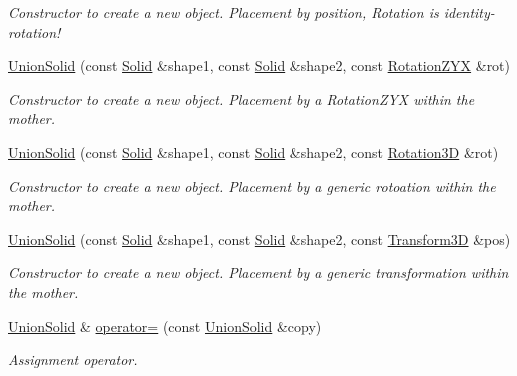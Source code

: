 \begin{DoxyCompactItemize}
\begin{DoxyCompactList}\small\item\em Constructor to create a new object. Placement by position, Rotation is identity-\/rotation! \item\end{DoxyCompactList}\item 
\hyperlink{class_d_d4hep_1_1_geometry_1_1_union_solid_a7756c7183422cf3f33cee33b161389e0}{UnionSolid} (const \hyperlink{class_d_d4hep_1_1_geometry_1_1_solid__type}{Solid} \&shape1, const \hyperlink{class_d_d4hep_1_1_geometry_1_1_solid__type}{Solid} \&shape2, const \hyperlink{namespace_d_d4hep_1_1_geometry_a24667b2b9c3cec3d5239828db4d52189}{RotationZYX} \&rot)
\begin{DoxyCompactList}\small\item\em Constructor to create a new object. Placement by a RotationZYX within the mother. \item\end{DoxyCompactList}\item 
\hyperlink{class_d_d4hep_1_1_geometry_1_1_union_solid_ab24f18730c80761ea9acb96e802242c3}{UnionSolid} (const \hyperlink{class_d_d4hep_1_1_geometry_1_1_solid__type}{Solid} \&shape1, const \hyperlink{class_d_d4hep_1_1_geometry_1_1_solid__type}{Solid} \&shape2, const \hyperlink{namespace_d_d4hep_1_1_geometry_a022fecb763315fa2bf39cbb648944a0e}{Rotation3D} \&rot)
\begin{DoxyCompactList}\small\item\em Constructor to create a new object. Placement by a generic rotoation within the mother. \item\end{DoxyCompactList}\item 
\hyperlink{class_d_d4hep_1_1_geometry_1_1_union_solid_ad75ca3619515031cb82d0474bd8c6fc2}{UnionSolid} (const \hyperlink{class_d_d4hep_1_1_geometry_1_1_solid__type}{Solid} \&shape1, const \hyperlink{class_d_d4hep_1_1_geometry_1_1_solid__type}{Solid} \&shape2, const \hyperlink{namespace_d_d4hep_1_1_geometry_aeb4c0356d12fd7be49a0aae50514e64b}{Transform3D} \&pos)
\begin{DoxyCompactList}\small\item\em Constructor to create a new object. Placement by a generic transformation within the mother. \item\end{DoxyCompactList}\item 
\hyperlink{class_d_d4hep_1_1_geometry_1_1_union_solid}{UnionSolid} \& \hyperlink{class_d_d4hep_1_1_geometry_1_1_union_solid_a797ed87b05428ba918935e35562cb364}{operator=} (const \hyperlink{class_d_d4hep_1_1_geometry_1_1_union_solid}{UnionSolid} \&copy)
\begin{DoxyCompactList}\small\item\em Assignment operator. \item\end{DoxyCompactList}\end{DoxyCompactItemize}


